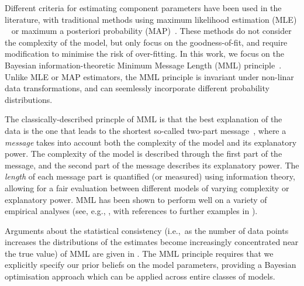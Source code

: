 \documentclass{elsarticle}
\begin{document}
Different criteria for estimating component parameters have been used in the 
literature, with traditional methods using maximum likelihood estimation (MLE)
~\cite{akaike1971determination} or maximum a posteriori probability (MAP)~\cite{shimony1994finding}.
These methods do not consider the complexity of the model, but only focus on
the goodness-of-fit, and require modification to minimise the risk of
over-fitting. In this work, we focus on the Bayesian information-theoretic 
Minimum Message Length (MML) principle~\cite{WallaceBoulton1968, WallaceFreeman1987, WallaceDowe1999a, Wallace:2005}.
Unlike MLE or MAP estimators, the MML principle is invariant under non-linar
data transformations, and can seemlessly incorporate different probability
distributions.



%
%
The classically-described princple of MML is that the best explanation of the
data is the one that leads to the shortest so-called two-part message~\cite{Wallace:2005}, 
where a \textit{message} takes into account both the complexity of the model 
and its explanatory power. The complexity of the model is described through
the first part of the message, and the second part of the message describes
its explanatory power. The \emph{length} of each message part is quantified
(or measured) using information theory, allowing for a fair evaluation between
different models of varying complexity or explanatory power. MML has been 
shown to perform well on a variety of empirical analyses (see, e.g., 
\cite{viswanathan1999finding,fitzgibbon2004minimum}, with references to 
further examples in \cite{Wallace:2005,dowe2007bayes,Dowe2008a,Dowe2011a}).


Arguments about the statistical consistency (i.e.,~as the number of data 
points increases the distributions of the estimates become increasingly 
concentrated near the true value) of MML are given in \cite{DoweWallace1997a,Dowe2011a}.
The MML principle requires that we explicitly specify our prior beliefs on the
model parameters, providing a Bayesian optimisation approach which can be
applied across entire classes of models.
\end{document}
